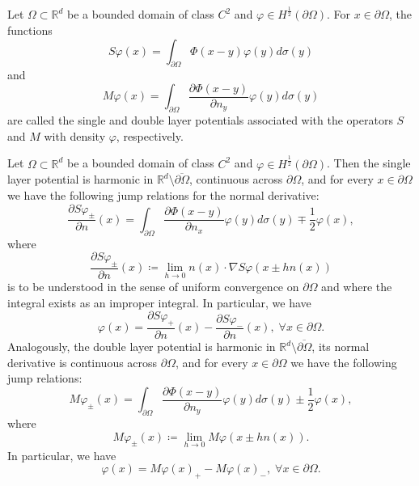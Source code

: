 \begin{definition}\label{definition_single_and_double_layer_potentials}
    Let \(\Omega \subset \mathbb{R}^d\) be a bounded domain of class \(C^2\) and \(\varphi \in H^\frac{1}{2}(\partial\Omega)\). For $x \in \partial\Omega$, the functions
    \[
        S\varphi(x) = \int_{\partial\Omega} \Phi(x-y)\varphi(y) d\sigma(y)
    \]
    and
    \[
        M\varphi(x) = \int_{\partial\Omega} \frac{\partial \Phi(x-y)}{\partial n_y}\varphi(y) d\sigma(y)
    \]
    are called the single and double layer potentials associated with the operators $S$ and $M$ with density \(\varphi\), respectively.
\end{definition}
\begin{proposition}\label{sl_jump}
    Let \(\Omega  \subset \mathbb{R}^d\) be a bounded domain of class \(C^2\) and \(\varphi \in H^\frac{1}{2}(\partial\Omega)\). Then the single layer potential is harmonic in \(\mathbb{R}^d\setminus \overline{\partial\Omega}\), continuous across \(\partial\Omega\), and for every \(x \in \partial\Omega\) we have the following jump relations for the normal derivative:
    \[
        \frac{\partial S\varphi_\pm}{\partial n}(x) = \int_{\partial\Omega} \frac{\partial\Phi(x-y)}{\partial n_x}\varphi(y) d\sigma(y) \mp \frac{1}{2}\varphi(x),
    \]
    where
    $$\frac{\partial S \varphi_\pm}{\partial n}(x) \coloneq \lim_{h \rightarrow 0} n(x) \cdot \nabla S\varphi(x \pm h n(x))$$
    is to be understood in the sense of uniform convergence on $\partial\Omega$ and where the integral exists as an improper integral.
    In particular, we have
    \[
        \varphi(x) = \frac{\partial S\varphi_+}{\partial n}(x)-\frac{\partial S\varphi_-}{\partial n}(x), \; \forall x \in \partial\Omega.
    \]
    Analogously, the double layer potential is harmonic in \(\mathbb{R}^d\setminus \overline{\partial\Omega}\), its normal derivative is continuous across \(\partial\Omega\), and for every \(x \in \partial\Omega\) we have the following jump relations:
    \[
        M\varphi_\pm(x) = \int_{\partial\Omega} \frac{\partial\Phi(x-y)}{\partial n_y}\varphi(y) d\sigma(y) \pm \frac{1}{2}\varphi(x),
    \]
    where
    \[
        M\varphi_\pm(x) \coloneq \lim_{h \rightarrow 0} M\varphi(x \pm h n(x)).
    \]
    In particular, we have
    \[
        \varphi(x) = M\varphi(x)_+-M\varphi(x)_-, \; \forall x \in \partial\Omega.
    \]



\end{proposition}
